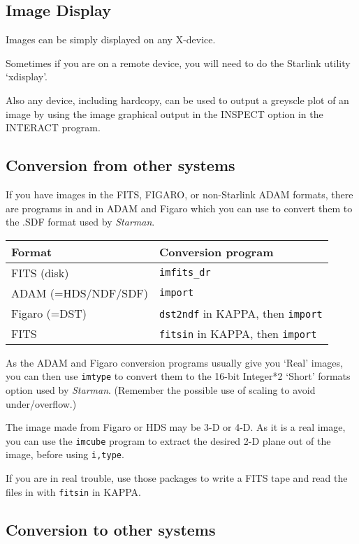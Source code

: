 \subsection{Image Display}

Images can be simply displayed on any X-device.

Sometimes if you are on a remote device, you will need to do the
Starlink utility `xdisplay'.

Also any device, including hardcopy, can be used to output a greyscle
plot of an image  by using the image graphical output in the INSPECT
option in the INTERACT program.


\subsection{Conversion from other systems}

If you have images in the FITS, FIGARO, or non-Starlink ADAM formats,
there are programs in \starman and in ADAM and Figaro which you can use
to convert them to the .SDF format used by {\it Starman}.

\hspace{4ex} \begin{tabular}[c]{|l|l|} \hline
   Format              &   Conversion program \\ \hline FITS
   (disk)         &   \verb|imfits_dr| \\ ADAM (=HDS/NDF/SDF) &
   \verb|import| \\ Figaro (=DST)       &   \verb|dst2ndf| in KAPPA,
   then \verb|import| \\ FITS                &   \verb|fitsin| in
   KAPPA, then \verb|import| \\ \hline \end{tabular}

As the ADAM and Figaro conversion programs usually give you `Real'
images, you can then use \verb|imtype| to convert them to the 16-bit
Integer*2 `Short' formats option used by {\it Starman}. (Remember the
possible use of scaling to avoid under/overflow.)

The image made from Figaro or HDS may be 3-D or 4-D. As it is a real
image, you can use the \verb|imcube| program to extract the desired 2-D
plane out of the image, before using \verb|i,type|.

If you are in real trouble, use those packages to write a FITS tape and
read the files in with \verb|fitsin| in KAPPA.

\subsection{Conversion to other systems}

